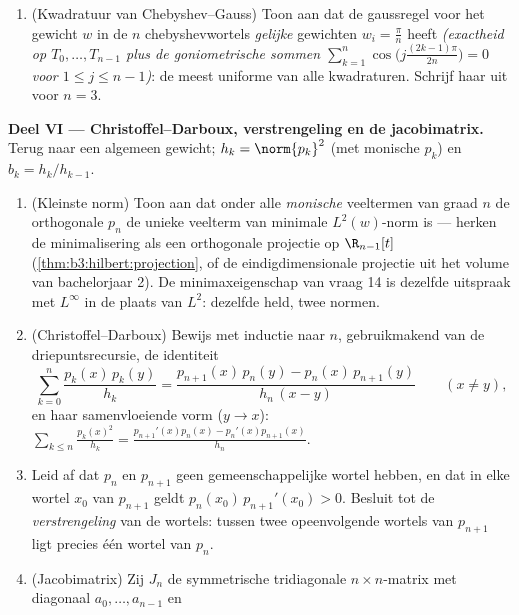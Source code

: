 \begin{problem}
\begin{enumerate}[resume]
        zo groot als $n^2$ hebben (de ongelijkheid van Markov
        zegt dat het niet groter kan --- enkel de uitspraak).
        Waar in het interval is de grens voor de afgeleide
        slechts $O(n)$?
  \item (Kwadratuur van Chebyshev--Gauss) Toon aan dat de
        gaussregel voor het gewicht $w$ in de $n$
        chebyshevwortels \emph{gelijke} gewichten $w_i = \frac\pi
        n$ heeft \emph{(exactheid op $T_0, \dots, T_{n-1}$ plus
        de goniometrische sommen
        $\sum_{k=1}^n\cos\bigl(j\tfrac{(2k-1)\pi}{2n}\bigr) = 0$
        voor $1 \leq j \leq n - 1$)}: de meest uniforme van alle
        kwadraturen. Schrijf haar uit voor $n = 3$.
\end{enumerate}

\medskip
\noindent\textbf{Deel VI --- Christoffel--Darboux, verstrengeling
en de jacobimatrix.} Terug naar een algemeen gewicht; $h_k =
\norm{p_k}^2$ (met monische $p_k$) en $b_k = h_k/h_{k-1}$.
\begin{enumerate}[resume]
  \item (Kleinste norm) Toon aan dat onder alle \emph{monische}
        veeltermen van graad $n$ de orthogonale $p_n$ de unieke
        veelterm van minimale $L^2(w)$-norm is --- herken de
        minimalisering als een orthogonale projectie op
        $\R_{n-1}[t]$ (\cref{thm:b3:hilbert:projection}, of de
        eindigdimensionale projectie uit het volume van
        bachelorjaar 2). De minimaxeigenschap van vraag 14 is
        dezelfde uitspraak met $L^\infty$ in de plaats van
        $L^2$: dezelfde held, twee normen.
  \item (Christoffel--Darboux) Bewijs met inductie naar $n$,
        gebruikmakend van de driepuntsrecursie, de identiteit
        \[
        \sum_{k=0}^{n}\frac{p_k(x)\,p_k(y)}{h_k}
        = \frac{p_{n+1}(x)\,p_n(y) -
        p_n(x)\,p_{n+1}(y)}{h_n\,(x - y)}
        \qquad (x \neq y),
        \]
        en haar samenvloeiende vorm ($y \to x$):
        $\sum_{k\leq n}\frac{p_k(x)^2}{h_k} =
        \frac{p_{n+1}'(x)p_n(x) - p_n'(x)p_{n+1}(x)}{h_n}$.
  \item Leid af dat $p_n$ en $p_{n+1}$ geen gemeenschappelijke
        wortel hebben, en dat in elke wortel $x_0$ van $p_{n+1}$
        geldt $p_n(x_0)\,p_{n+1}'(x_0) > 0$. Besluit tot de
        \emph{verstrengeling} van de wortels: tussen twee
        opeenvolgende wortels van $p_{n+1}$ ligt precies één
        wortel van $p_n$.
  \item (Jacobimatrix) Zij $J_n$ de symmetrische tridiagonale
        $n\times n$-matrix met diagonaal $a_0, \dots, a_{n-1}$ en

\end{enumerate}
\end{problem}

